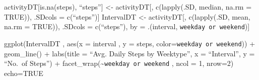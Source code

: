 \documentclass[]{article}
\begin{document}
activityDT{[}is.na(steps), ``steps''{]} \textless{}- activityDT{[},
c(lapply(.SD, median, na.rm = TRUE)), .SDcols = c(``steps''){]}
IntervalDT \textless{}- activityDT{[}, c(lapply(.SD, mean, na.rm =
TRUE)), .SDcols = c(``steps''), by = .(interval,
\texttt{weekday\ or\ weekend}){]}

ggplot(IntervalDT , aes(x = interval , y = steps,
color=\texttt{weekday\ or\ weekend})) + geom\_line() + labs(title =
``Avg. Daily Steps by Weektype'', x = ``Interval'', y = ``No.~of
Steps'') + facet\_wrap(\textasciitilde{}\texttt{weekday\ or\ weekend} ,
ncol = 1, nrow=2) echo=TRUE
\end{document}
